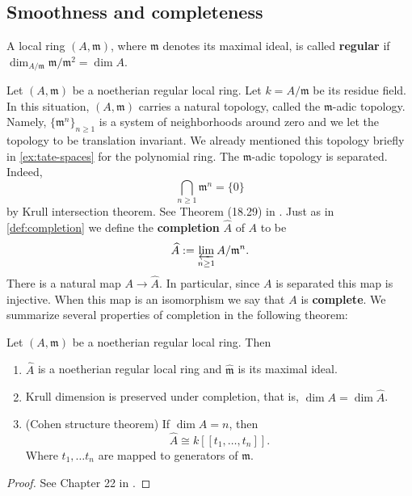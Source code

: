\subsection{Smoothness and completeness}
\begin{definition}\label{def:regular-local-ring}
	A local ring $(A, \mathfrak{m})$, where $\mathfrak{m}$ denotes its maximal ideal, is called \textbf{regular} if $\dim_{A/\mathfrak{m}} \mathfrak{m}/\mathfrak{m}^{2} = \dim A$. 
\end{definition}
Let $(A,\mathfrak{m})$ be a noetherian regular local ring. Let $k = A/\mathfrak{m}$ be its residue field. In this situation, $(A,\mathfrak{m})$ carries a natural topology, called the $\mathfrak{m}$-adic topology. Namely, $\{\mathfrak{m}^{n}\}_{n\geq 1}$ is a system of neighborhoods around zero and we let the topology to be translation invariant. We already mentioned this topology briefly in \cref{ex:tate-spaces} for the polynomial ring. The $\mathfrak{m}$-adic topology is separated. Indeed, 
\[
	\bigcap_{n\geq 1} \mathfrak{m}^{n} = \{0\}
\]
by Krull intersection theorem. See Theorem (18.29) in \cite{comm-alg}. Just as in \cref{def:completion} we define the \textbf{completion} $\widehat{A}$ of $A$ to be 
\[
	\widehat{A} := \varprojlim_{n\geq 1} A/\mathfrak{m}^{n}.
\]
There is a natural map $A \to \widehat{A}$. In particular, since $A$ is separated this map is injective. When this map is an isomorphism we say that $A$ is \textbf{complete}. We summarize several properties of completion in the following theorem:
\begin{theorem}\label{thm:properties-adic-completion}
	Let $(A,\mathfrak{m})$ be a noetherian regular local ring. Then
	\begin{enumerate}[label = (\alph*)]
		\item $\widehat{A}$ is a noetherian regular local ring and $\widehat{\mathfrak{m}}$ is its maximal ideal.
		\item Krull dimension is preserved under completion, that is, $\dim A = \dim \widehat{A}$.
		\item (Cohen structure theorem) If $\dim A = n$, then
		\[
			\widehat{A} \cong k\left[[t_{1}, \ldots, t_{n}]\right].
		\]
		Where $t_{1}, \ldots t_{n}$ are mapped to generators of $\mathfrak{m}$.
	\end{enumerate}
	\begin{proof}
	See Chapter 22 in \cite{comm-alg}.  
	\end{proof}
	
\end{theorem}
